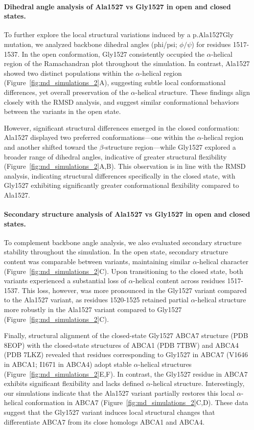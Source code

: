 \paragraph{Dihedral angle analysis of Ala1527 vs Gly1527 in open and closed states.}
To further explore the local structural variations induced by a p.Ala1527Gly mutation, we analyzed backbone dihedral angles (phi/psi; $\phi/\psi$) for residues 1517-1537. In the open conformation, Gly1527 consistently occupied the $\alpha$-helical region of the Ramachandran plot throughout the simulation. In contrast, Ala1527 showed two distinct populations within the $\alpha$-helical region (Figure~\ref{fig:md_simulations_2}A), suggesting subtle local conformational differences, yet overall preservation of the $\alpha$-helical structure. These findings align closely with the RMSD analysis, and suggest similar conformational behaviors between the variants in the open state.

However, significant structural differences emerged in the closed conformation: Ala1527 displayed two preferred conformations—one within the $\alpha$-helical region and another shifted toward the $\beta$-structure region—while Gly1527 explored a broader range of dihedral angles, indicative of greater structural flexibility (Figure~\ref{fig:md_simulations_2}A,B). This observation is in line with the RMSD analysis, indicating structural differences specifically in the closed state, with Gly1527 exhibiting significantly greater conformational flexibility compared to Ala1527.

\paragraph{Secondary structure analysis of Ala1527 vs Gly1527 in open and closed states.}
To complement backbone angle analysis, we also evaluated secondary structure stability throughout the simulation. In the open state, secondary structure content was comparable between variants, maintaining similar $\alpha$-helical character (Figure~\ref{fig:md_simulations_2}C). Upon transitioning to the closed state, both variants experienced a substantial loss of $\alpha$-helical content across residues 1517-1537. This loss, however, was more pronounced in the Gly1527 variant compared to the Ala1527 variant, as residues 1520-1525 retained partial $\alpha$-helical structure more robustly in the Ala1527 variant compared to Gly1527 (Figure~\ref{fig:md_simulations_2}C).

Finally, structural alignment of the closed-state Gly1527 ABCA7 structure (PDB 8EOP) with the closed-state structures of ABCA1 (PDB 7TBW) and ABCA4 (PDB 7LKZ) revealed that residues corresponding to Gly1527 in ABCA7 (V1646 in ABCA1; I1671 in ABCA4) adopt stable $\alpha$-helical structures (Figure~\ref{fig:md_simulations_2}E,F). In contrast, the Gly1527 residue in ABCA7 exhibits significant flexibility and lacks defined $\alpha$-helical structure. Interestingly, our simulations indicate that the Ala1527 variant partially restores this local $\alpha$-helical conformation in ABCA7 (Figure~\ref{fig:md_simulations_2}C,D). These data suggest that the Gly1527 variant induces local structural changes that differentiate ABCA7 from its close homologs ABCA1 and ABCA4.
